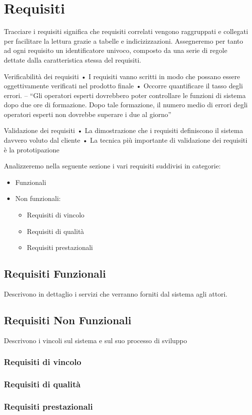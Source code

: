\section{Requisiti}
    Tracciare i requisiti significa che requisiti correlati vengono raggruppati e collegati per facilitare la lettura grazie a tabelle e indicizizzazioni.
    Assegneremo per tanto ad ogni requisito un identificatore univoco, composto da una serie di regole dettate dalla caratteristica stessa del requisiti.
    
    Verificabilità dei requisiti
    • I requisiti vanno scritti in modo che possano essere
    oggettivamente verificati nel prodotto finale
    • Occorre quantificare il tasso degli errori.
    – “Gli operatori esperti dovrebbero poter controllare le
    funzioni di sistema dopo due ore di formazione.
    Dopo tale formazione, il numero medio di errori
    degli operatori esperti non dovrebbe superare i due
    al giorno”
    
    Validazione dei requisiti
    • La dimostrazione che i requisiti definiscono il
    sistema davvero voluto dal cliente
    • La tecnica più importante di validazione dei
    requisiti è la prototipazione


    Analizzeremo nella seguente sezione i vari requisiti suddivisi in categorie:
    \begin{itemize}
        \item Funzionali
        \item Non funzionali:
            \begin{itemize}
                \item Requisiti di vincolo
                \item Requisiti di qualità
                \item Requisiti prestazionali
            \end{itemize}
    \end{itemize}
		\subsection{Requisiti Funzionali}			
        Descrivono in dettaglio i servizi che verranno forniti dal sistema agli attori.
        
        \subsection{Requisiti Non Funzionali}
        Descrivono i vincoli sul sistema e sul suo processo di sviluppo
        \subsubsection{Requisiti di vincolo}
        
        \subsubsection{Requisiti di qualità}
        \subsubsection{Requisiti prestazionali}
